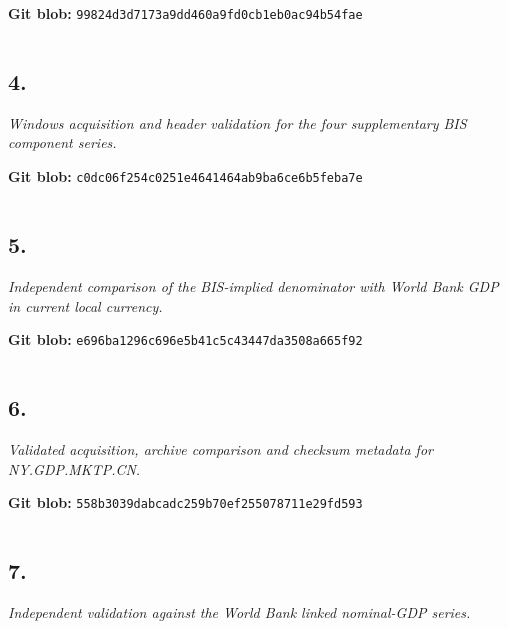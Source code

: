 \documentclass[10pt]{article}
\begin{document}
\noindent\textbf{Git blob:} \texttt{99824d3d7173a9dd460a9fd0cb1eb0ac94b54fae}

\inputminted[linenos,fontsize=\scriptsize,breaklines,breakanywhere]{stata}{replication/denominator_diagnostic.do}


\clearpage
\subsection*{4. \texttt{}}
\textit{Windows acquisition and header validation for the four supplementary BIS component series.}

\noindent\textbf{Git blob:} \texttt{c0dc06f254c0251e4641464ab9ba6ce6b5feba7e}

\inputminted[linenos,fontsize=\scriptsize,breaklines,breakanywhere]{powershell}{replication/download_denominator_sources.ps1}


\clearpage
\subsection*{5. \texttt{}}
\textit{Independent comparison of the BIS-implied denominator with World Bank GDP in current local currency.}

\noindent\textbf{Git blob:} \texttt{e696ba1296c696e5b41c5c43447da3508a665f92}

\inputminted[linenos,fontsize=\scriptsize,breaklines,breakanywhere]{stata}{replication/validate_nominal_gdp.do}


\clearpage
\subsection*{6. \texttt{}}
\textit{Validated acquisition, archive comparison and checksum metadata for NY.GDP.MKTP.CN.}

\noindent\textbf{Git blob:} \texttt{558b3039dabcadc259b70ef255078711e29fd593}

\inputminted[linenos,fontsize=\scriptsize,breaklines,breakanywhere]{powershell}{replication/download_nominal_gdp.ps1}


\clearpage
\subsection*{7. \texttt{}}
\textit{Independent validation against the World Bank linked nominal-GDP series.}
\end{document}
